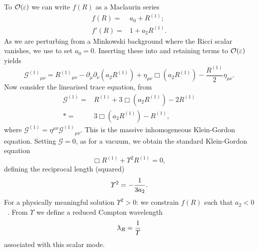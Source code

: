 To $\mathcal{O}({\varepsilon})$ we can write $f(R)$ as a Maclaurin series
\begin{align}
f(R) = {} & a_0 + R^{(1)}; \\
f'(R) = {} & 1 + a_2 R^{(1)}.
\end{align}
As we are perturbing from a Minkowski background where the Ricci scalar vanishes, we use  to set $a_0 = 0$. Inserting these into  and retaining terms to $\mathcal{O}({\varepsilon})$ yields
\begin{equation}
{\mathcal{G}^{(1)}}_{\mu\nu} = {R^{(1)}}_{\mu\nu} - \partial_\mu\partial_\nu(a_2 R^{(1)}) + \eta_{\mu\nu}\Box(a_2 R^{(1)}) - \frac{R^{(1)}}{2}\eta_{\mu\nu}.
\label{eq:Field}
\end{equation}
Now consider the linearised trace equation, from 
\begin{align}
\mathcal{G}^{(1)} = {} & R^{(1)} + 3 \Box(a_2 R^{(1)}) - 2 R^{(1)} \nonumber \\*
 = {} & 3 \Box(a_2 R^{(1)}) - R^{(1)},
\label{eq:Box_R}
\end{align}
where $\mathcal{G}^{(1)} = \eta^{\mu\nu}{\mathcal{G}^{(1)}}_{\mu\nu}$. This is the massive inhomogeneous Klein-Gordon equation. Setting $\mathcal{G} = 0$, as for a vacuum, we obtain the standard Klein-Gordon equation
\begin{equation}
\Box R^{(1)} + \Upsilon^2 R^{(1)} = 0,
\end{equation}
defining the reciprocal length (squared)
\begin{equation}
\Upsilon^2 = -\frac{1}{3a_2}.
\end{equation}
For a physically meaningful solution $\Upsilon^2 > 0$: we constrain $f(R)$ such that $a_2 < 0$~\cite{Schmidt1986, Teyssandier1990, Olmo2005c, Corda2008}. From $\Upsilon$ we define a reduced Compton wavelength
\begin{equation}
\lambdabar_R = \recip{\Upsilon}
\end{equation}
associated with this scalar mode.

